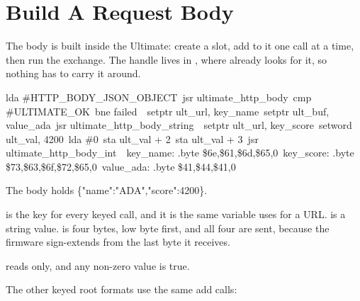 \section{Build A Request Body}

The body is built inside the Ultimate: create a slot, add to it one call at a
time, then run the exchange. The handle lives in , where
 already looks for it, so nothing has to carry it
around.

\begin{listingbox}
\hspace*{2em}lda \#HTTP\_BODY\_JSON\_OBJECT\
\hspace*{2em}jsr ultimate\_http\_body\
\hspace*{2em}cmp \#ULTIMATE\_OK\
\hspace*{2em}bne failed\
\
\hspace*{2em}setptr ult\_url, key\_name\
\hspace*{2em}setptr ult\_buf, value\_ada\
\hspace*{2em}jsr ultimate\_http\_body\_string\
\
\hspace*{2em}setptr ult\_url, key\_score\
\hspace*{2em}setword ult\_val, 4200\
\hspace*{2em}lda \#0\
\hspace*{2em}sta ult\_val + 2\
\hspace*{2em}sta ult\_val + 3\
\hspace*{2em}jsr ultimate\_http\_body\_int\
\
key\_name:  .byte \$6e,\$61,\$6d,\$65,0\
key\_score: .byte \$73,\$63,\$6f,\$72,\$65,0\
value\_ada: .byte \$41,\$44,\$41,0
\end{listingbox}

\begin{resultbox}
The body holds \{"name":"ADA","score":4200\}.
\end{resultbox}

\cmd{ult\_url} is the key for every keyed call, and it is the same variable
 uses for a URL.  is a string value.
\cmd{ult\_val} is four bytes, low byte first, and all four are sent, because
the firmware sign-extends from the last byte it receives.

 reads  only, and any
non-zero value is true.

The other keyed root formats use the same add calls:

